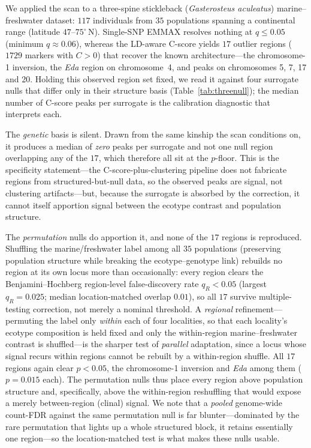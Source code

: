 \documentclass[11pt]{article}
\begin{document}
We applied the scan to a three-spine stickleback (\textit{Gasterosteus aculeatus})
marine--freshwater dataset: $117$ individuals from $35$ populations spanning a
continental range (latitude $47$--$75^\circ$\,N). Single-SNP EMMAX resolves nothing
at $q \le 0.05$ (minimum $q \approx 0.06$), whereas the LD-aware C-score yields
$17$ outlier regions ($1729$ markers with $C > 0$) that recover the known
architecture---the chromosome-1 inversion, the \textit{Eda} region on
chromosome~4, and peaks on chromosomes 5, 7, 17 and 20. Holding this observed
region set fixed, we read it against four surrogate nulls that differ only in their
structure basis (Table~\ref{tab:threenull}); the median number of C-score peaks per
surrogate is the calibration diagnostic that interprets each.

The \emph{genetic} basis is silent. Drawn from the same kinship the scan conditions
on, it produces a median of \emph{zero} peaks per surrogate and not one null region
overlapping any of the $17$, which therefore all sit at the $p$-floor. This is the
specificity statement---the C-score-plus-clustering pipeline does not fabricate
regions from structured-but-null data, so the observed peaks are signal, not
clustering artifacts---but, because the surrogate is absorbed by the correction, it
cannot itself apportion signal between the ecotype contrast and population
structure.

The \emph{permutation} nulls do apportion it, and none of the $17$ regions is
reproduced. Shuffling the marine/freshwater label among all $35$ populations
(preserving population structure while breaking the ecotype--genotype link) rebuilds
no region at its own locus more than occasionally: every region clears the
Benjamini--Hochberg region-level false-discovery rate $q_R < 0.05$ (largest
$q_R = 0.025$; median location-matched overlap $0.01$), so all $17$ survive
multiple-testing correction, not merely a nominal threshold. A \emph{regional}
refinement---permuting
the label only \emph{within} each of four localities, so that each locality's
ecotype composition is held fixed and only the within-region marine--freshwater
contrast is shuffled---is the sharper test of \emph{parallel} adaptation, since a
locus whose signal recurs within regions cannot be rebuilt by a within-region
shuffle. All $17$ regions again clear $p < 0.05$, the chromosome-1 inversion and
\textit{Eda} among them ($p = 0.015$ each). The permutation nulls thus place every
region above population structure and, specifically, above the within-region
reshuffling that would expose a merely between-region (clinal) signal. We note that
a \emph{pooled} genome-wide count-FDR against the same permutation null is far
blunter---dominated by the rare permutation that lights up a whole structured block,
it retains essentially one region---so the location-matched test is what makes these
nulls usable.
\end{document}
